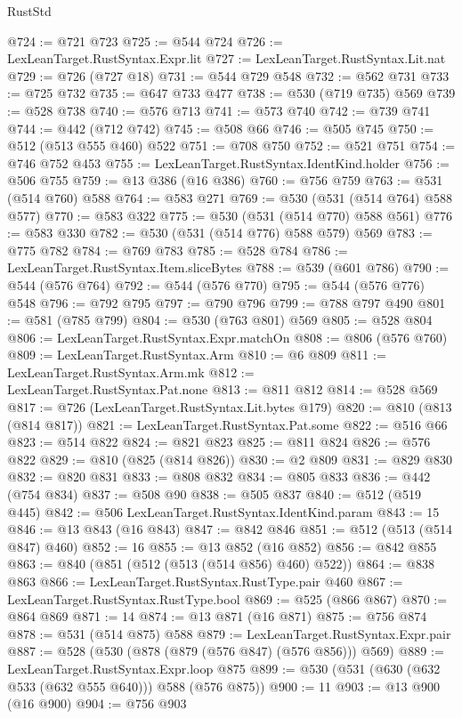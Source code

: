 \begin{lexlean}{RustStd}
\begin{coremodule}
@724 := @721 @723
@725 := @544 @724
@726 := LexLeanTarget.RustSyntax.Expr.lit
@727 := LexLeanTarget.RustSyntax.Lit.nat
@729 := @726 (@727 @18)
@731 := @544 @729 @548
@732 := @562 @731
@733 := @725 @732
@735 := @647 @733 @477
@738 := @530 (@719 @735) @569
@739 := @528 @738
@740 := @576 @713
@741 := @573 @740
@742 := @739 @741
@744 := @442 (@712 @742)
@745 := @508 @66
@746 := @505 @745
@750 := @512 (@513 @555 @460) @522
@751 := @708 @750
@752 := @521 @751
@754 := @746 @752 @453
@755 := LexLeanTarget.RustSyntax.IdentKind.holder
@756 := @506 @755
@759 := @13 @386 (@16 @386)
@760 := @756 @759
@763 := @531 (@514 @760) @588
@764 := @583 @271
@769 := @530 (@531 (@514 @764) @588 @577)
@770 := @583 @322
@775 := @530 (@531 (@514 @770) @588 @561)
@776 := @583 @330
@782 := @530 (@531 (@514 @776) @588 @579) @569
@783 := @775 @782
@784 := @769 @783
@785 := @528 @784
@786 := LexLeanTarget.RustSyntax.Item.sliceBytes
@788 := @539 (@601 @786)
@790 := @544 (@576 @764)
@792 := @544 (@576 @770)
@795 := @544 (@576 @776) @548
@796 := @792 @795
@797 := @790 @796
@799 := @788 @797 @490
@801 := @581 (@785 @799)
@804 := @530 (@763 @801) @569
@805 := @528 @804
@806 := LexLeanTarget.RustSyntax.Expr.matchOn
@808 := @806 (@576 @760)
@809 := LexLeanTarget.RustSyntax.Arm
@810 := @6 @809
@811 := LexLeanTarget.RustSyntax.Arm.mk
@812 := LexLeanTarget.RustSyntax.Pat.none
@813 := @811 @812
@814 := @528 @569
@817 := @726 (LexLeanTarget.RustSyntax.Lit.bytes @179)
@820 := @810 (@813 (@814 @817))
@821 := LexLeanTarget.RustSyntax.Pat.some
@822 := @516 @66
@823 := @514 @822
@824 := @821 @823
@825 := @811 @824
@826 := @576 @822
@829 := @810 (@825 (@814 @826))
@830 := @2 @809
@831 := @829 @830
@832 := @820 @831
@833 := @808 @832
@834 := @805 @833
@836 := @442 (@754 @834)
@837 := @508 @90
@838 := @505 @837
@840 := @512 (@519 @445)
@842 := @506 LexLeanTarget.RustSyntax.IdentKind.param
@843 := 15
@846 := @13 @843 (@16 @843)
@847 := @842 @846
@851 := @512 (@513 (@514 @847) @460)
@852 := 16
@855 := @13 @852 (@16 @852)
@856 := @842 @855
@863 := @840 (@851 (@512 (@513 (@514 @856) @460) @522))
@864 := @838 @863
@866 := LexLeanTarget.RustSyntax.RustType.pair @460
@867 := LexLeanTarget.RustSyntax.RustType.bool
@869 := @525 (@866 @867)
@870 := @864 @869
@871 := 14
@874 := @13 @871 (@16 @871)
@875 := @756 @874
@878 := @531 (@514 @875) @588
@879 := LexLeanTarget.RustSyntax.Expr.pair
@887 := @528 (@530 (@878 (@879 (@576 @847) (@576 @856))) @569)
@889 := LexLeanTarget.RustSyntax.Expr.loop @875
@899 := @530 (@531 (@630 (@632 @533 (@632 @555 @640))) @588 (@576 @875))
@900 := 11
@903 := @13 @900 (@16 @900)
@904 := @756 @903

\end{coremodule}
\end{lexlean}
